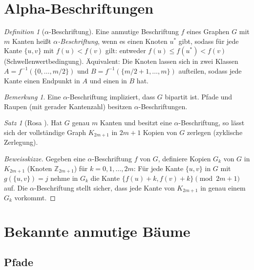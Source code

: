 \documentclass[12pt,a4paper]{amsart}
\theoremstyle{definition}
\theoremstyle{remark}
\newtheorem{satz}[theorem]{Satz}
\newtheorem{bemerkung}[theorem]{Bemerkung}
\newtheorem{definition_de}[theorem]{Definition}
\newcommand{\Z}{\mathbb{Z}}
\begin{document}
\section{Alpha-Beschriftungen}\label{sec:alpha}

\begin{definition_de}[$\alpha$-Beschriftung]\label{def:alpha}
Eine anmutige Beschriftung $f$ eines Graphen $G$ mit $m$ Kanten heißt
\emph{$\alpha$-Beschriftung}, wenn es einen Knoten $u^*$ gibt, sodass für jede
Kante $\{u, v\}$ mit $f(u) < f(v)$ gilt: entweder $f(u) \leq f(u^*) < f(v)$
(Schwellenwertbedingung). Äquivalent: Die Knoten lassen sich in zwei Klassen
$A = f^{-1}(\{0, \ldots, m/2\})$ und $B = f^{-1}(\{m/2+1, \ldots, m\})$ aufteilen,
sodass jede Kante einen Endpunkt in $A$ und einen in $B$ hat.
\end{definition_de}

\begin{bemerkung}
Eine $\alpha$-Beschriftung impliziert, dass $G$ bipartit ist. Pfade und Raupen
(mit gerader Kantenzahl) besitzen $\alpha$-Beschriftungen.
\end{bemerkung}

\begin{satz}[Rosa \cite{Rosa1967}]\label{satz:rosa_zerlegung}
Hat $G$ genau $m$ Kanten und besitzt eine $\alpha$-Beschriftung, so lässt sich
der vollständige Graph $K_{2m+1}$ in $2m+1$ Kopien von $G$ zerlegen (zyklische
Zerlegung).
\end{satz}

\begin{proof}[Beweisskizze]
Gegeben eine $\alpha$-Beschriftung $f$ von $G$, definiere Kopien $G_k$ von $G$
in $K_{2m+1}$ (Knoten $\Z_{2m+1}$) für $k = 0, 1, \ldots, 2m$: Für jede Kante
$\{u, v\}$ in $G$ mit $g(\{u,v\}) = j$ nehme in $G_k$ die Kante
$\{f(u) + k, f(v) + k\} \pmod{2m+1}$ auf. Die $\alpha$-Beschriftung stellt sicher,
dass jede Kante von $K_{2m+1}$ in genau einem $G_k$ vorkommt.
\end{proof}

\section{Bekannte anmutige Bäume}\label{sec:bekannt}

\subsection{Pfade}
\end{document}
